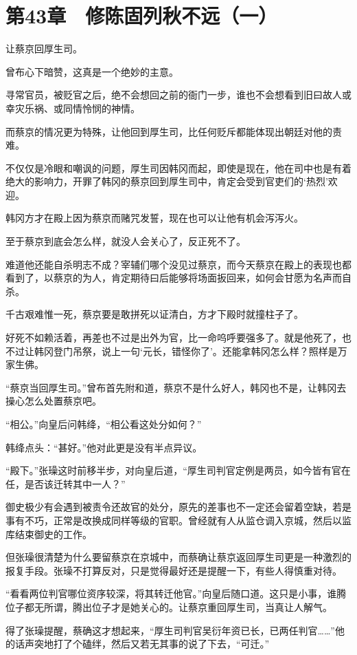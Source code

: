 \section{第43章　修陈固列秋不远（一）}

让蔡京回厚生司。

曾布心下暗赞，这真是一个绝妙的主意。

寻常官员，被贬官之后，绝不会想回之前的衙门一步，谁也不会想看到旧曰故人或幸灾乐祸、或同情怜悯的神情。

而蔡京的情况更为特殊，让他回到厚生司，比任何贬斥都能体现出朝廷对他的责难。

不仅仅是冷眼和嘲讽的问题，厚生司因韩冈而起，即使是现在，他在司中也是有着绝大的影响力，开罪了韩冈的蔡京回到厚生司中，肯定会受到官吏们的‘热烈’欢迎。

韩冈方才在殿上因为蔡京而赌咒发誓，现在也可以让他有机会泻泻火。

至于蔡京到底会怎么样，就没人会关心了，反正死不了。

难道他还能自杀明志不成？宰辅们哪个没见过蔡京，而今天蔡京在殿上的表现也都看到了，以蔡京的为人，肯定期待曰后能够将场面扳回来，如何会甘愿为名声而自杀。

千古艰难惟一死，蔡京要是敢拼死以证清白，方才下殿时就撞柱子了。

好死不如赖活着，再差也不过是出外为官，比一命呜呼要强多了。就是他死了，也不过让韩冈登门吊祭，说上一句‘元长，错怪你了’。还能拿韩冈怎么样？照样是万家生佛。

“蔡京当回厚生司。”曾布首先附和道，蔡京不是什么好人，韩冈也不是，让韩冈去操心怎么处置蔡京吧。

“相公。”向皇后问韩绛，“相公看这处分如何？”

韩绛点头：“甚好。”他对此更是没有半点异议。

“殿下。”张璪这时前移半步，对向皇后道，“厚生司判官定例是两员，如今皆有官在任，是否该迁转其中一人？”

御史极少有会遇到被责令还故官的处分，原先的差事也不一定还会留着空缺，若是事有不巧，正常是改换成同样等级的官职。曾经就有人从监仓调入京城，然后以监库结束御史的工作。

但张璪很清楚为什么要留蔡京在京城中，而蔡确让蔡京返回厚生司更是一种激烈的报复手段。张璪不打算反对，只是觉得最好还是提醒一下，有些人得慎重对待。

“看看两位判官哪位资序较深，将其转迁他官。”向皇后随口道。这只是小事，谁腾位子都无所谓，腾出位子才是她关心的。让蔡京重回厚生司，当真让人解气。

得了张璪提醒，蔡确这才想起来，“厚生司判官吴衍年资已长，已两任判官……”他的话声突地打了个磕绊，然后又若无其事的说了下去，“可迁。”

